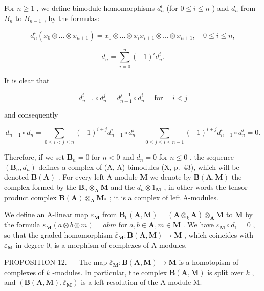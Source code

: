 For \(n \geqslant 1\) , we define bimodule homomorphisms \(d_n^i\) (for \(0 \leqslant i \leqslant n\) ) and \(d_n\) from \(B_n\) to \(B_{n-1}\) , by the formulas:

\[
d _ {n} ^ {i} (x _ {0} \otimes \ldots \otimes x _ {n + 1}) = x _ {0} \otimes \ldots \otimes x _ {i} x _ {i + 1} \otimes \ldots \otimes x _ {n + 1}, \quad 0 \leqslant i \leqslant n,
\]

\[
d _ {n} = \sum_ {i = 0} ^ {n} (- 1) ^ {i} d _ {n} ^ {i}.
\]

It is clear that

\[
d _ {n - 1} ^ {i} \circ d _ {n} ^ {j} = d _ {n - 1} ^ {j - 1} \circ d _ {n} ^ {i} \quad \text { for } \quad i <   j
\]

and consequently

\[
d _ {n - 1} \circ d _ {n} = \sum_ {0 \leqslant i <   j \leqslant n} (- 1) ^ {i + j} d _ {n - 1} ^ {i} \circ d _ {n} ^ {j} + \sum_ {0 \leqslant j \leqslant i \leqslant n - 1} (- 1) ^ {i + j} d _ {n - 1} ^ {i} \circ d _ {n} ^ {j} = 0.
\]

Therefore, if we set \(\mathbf{B}_n = 0\) for \(n < 0\) and \(d_n = 0\) for \(n \leqslant 0\) , the sequence \((\mathbf{B}_n, d_n)\) defines a complex of (A, A)-bimodules (X, p.~43), which will be denoted \(\mathbf{B}(\mathbf{A})\) . For every left A-module \(\mathbf{M}\) we denote by \(\mathbf{B}(\mathbf{A}, \mathbf{M})\) the complex formed by the \(\mathbf{B}_n \otimes_{\mathbf{A}} \mathbf{M}\) and the \(d_n \otimes 1_{\mathbf{M}}\) , in other words the tensor product complex \(\mathbf{B}(\mathbf{A}) \otimes_{\mathbf{A}} \mathbf{M}_{*}\) ; it is a complex of left A-modules.

We define an A-linear map \(\varepsilon_{\mathbf{M}}\) from \(\mathbf{B}_{0}(\mathbf{A},\mathbf{M}) = (\mathbf{A}\otimes_{k}\mathbf{A})\otimes_{\mathbf{A}}\mathbf{M}\) to \(\mathbf{M}\) by the formula \(\varepsilon_{\mathbf{M}}(a\otimes b\otimes m) = abm\) for \(a,b\in \mathbf{A},m\in \mathbf{M}\) . We have \(\varepsilon_{\mathbf{M}}\circ d_1 = 0\) , so that the graded homomorphism \(\overline{\varepsilon}_{\mathbf{M}}:\mathbf{B}(\mathbf{A},\mathbf{M})\to \mathbf{M}\) , which coincides with \(\varepsilon_{\mathbf{M}}\) in degree 0, is a morphism of complexes of A-modules.

PROPOSITION 12. --- The map \(\overline{\varepsilon}_{\mathbf{M}}: \mathbf{B}(\mathbf{A}, \mathbf{M}) \to \mathbf{M}\) is a homotopism of complexes of \(k\) -modules. In particular, the complex \(\mathbf{B}(\mathbf{A}, \mathbf{M})\) is split over \(k\) , and \((\mathbf{B}(\mathbf{A}, \mathbf{M}), \overline{\varepsilon}_{\mathbf{M}})\) is a left resolution of the A-module M.

